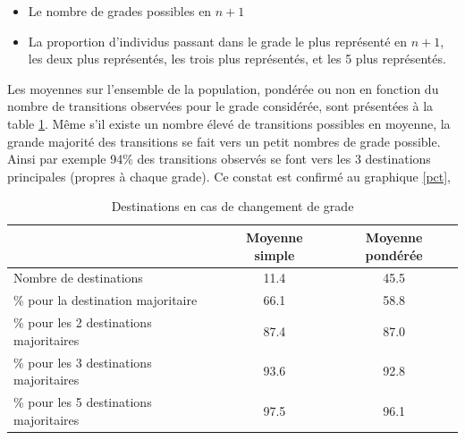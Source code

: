 \documentclass[11pt,a4paper]{article}
\begin{document}
\begin{itemize}[leftmargin=1cm ,parsep=0cm,itemsep=0cm,topsep=0cm] 
\item Le nombre de grades possibles en $n+1$
\item La proportion d'individus passant dans le grade le plus représenté en $n+1$, les deux plus représentés, les trois plus représentés, et les 5 plus représentés. 
\end{itemize}

Les moyennes sur l'ensemble de la population, pondérée ou non en fonction du nombre de transitions observées pour le grade considérée, sont présentées à la table \ref{means}. Même s'il existe un nombre élevé de transitions possibles en moyenne, la grande majorité des transitions se fait vers un petit nombres de grade possible. Ainsi par exemple 94\% des transitions observés se font vers les 3 destinations principales (propres à chaque grade). Ce constat est confirmé au graphique \ref{pct},

\begin{table}[ht]
\label{means}
\centering
\caption{Destinations en cas de changement de grade} 
\begin{tabular}{l|cc}
  \hline
 & Moyenne simple & Moyenne pondérée \\ 
  \hline
Nombre de destinations & 11.4 & 45.5 \\ 
  \% pour la destination majoritaire & 66.1 & 58.8 \\ 
  \% pour les 2 destinations majoritaires & 87.4 & 87.0 \\ 
  \% pour les 3 destinations majoritaires & 93.6 & 92.8 \\ 
  \% pour les 5 destinations majoritaires & 97.5 & 96.1 \\ 
   \hline
\end{tabular}
\end{table}
\end{document}
